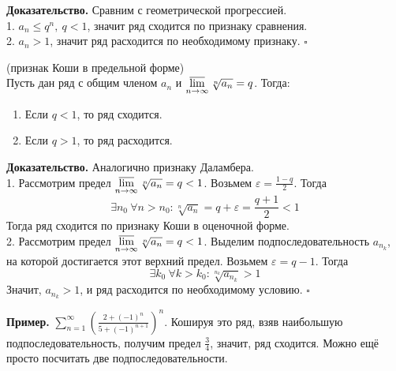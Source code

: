 \textbf{Доказательство.} Сравним с геометрической прогрессией.\\
1. $a_n\leqslant q^n,~q<1$, значит ряд сходится по признаку сравнения.\\
2. $a_n>1$, значит ряд расходится по необходимому признаку. $\square$ 
\begin{theor}
    (признак Коши в предельной форме)\\
    Пусть дан ряд с общим членом $a_n$ и 
    $\varlimsup\limits_{n \to \infty}\sqrt[n]{a_n}=q$. Тогда:
    \begin{enumerate}
        \item Если $q<1$, то ряд сходится.
        \item Если $q>1$, то ряд расходится.
    \end{enumerate}
\end{theor}
\textbf{Доказательство.} Аналогично признаку Даламбера.\\
1. Рассмотрим предел $\varlimsup\limits_{n \to \infty}\sqrt[n]{a_n}=q<1$. 
Возьмем $\varepsilon=\frac{1-q}{2}$. Тогда
$$\exists n_0~\forall n>n_0:\sqrt[n]{a_n}=q+\varepsilon=\frac{q+1}{2}<1$$
Тогда ряд сходится по признаку Коши в оценочной форме.\\
2. Рассмотрим предел $\varlimsup\limits_{n \to \infty}\sqrt[n]{a_n}=q<1$.
Выделим подпоследовательность $a_{n_k}$, на которой достигается этот верхний 
предел. Возьмем $\varepsilon=q-1$. Тогда
$$\exists k_0~\forall k>k_0:\sqrt[n_k]{a_{n_k}}>1$$
Значит, $a_{n_k}>1$, и ряд расходится по необходимому условию. 
$\square$

\textbf{Пример.} $\sum\limits_{n=1}^{\infty} \left(\frac{2+(-1)^{n}}
{5+(-1)^{n+1}}\right)^n$. Кошируя это ряд, взяв наибольшую
подпоследовательность, получим предел $\frac{3}{4}$, значит, ряд сходится. 
Можно ещё просто посчитать две подпоследовательности. 

